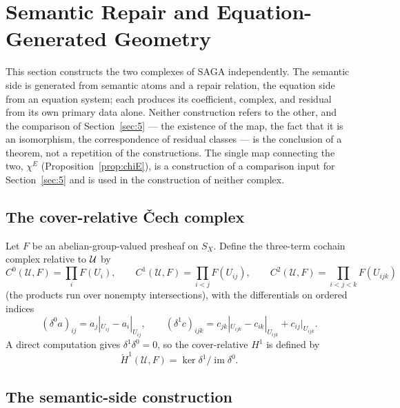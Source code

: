 \section{Semantic Repair and Equation-Generated Geometry}\label{sec:4}

This section constructs the two complexes of SAGA independently. The
semantic side is generated from semantic atoms and a repair relation, the
equation side from an equation system; each produces its coefficient,
complex, and residual from its own primary data alone. Neither
construction refers to the other, and the comparison of
Section~\ref{sec:5} --- the existence of the map, the fact that it is an
isomorphism, the correspondence of residual classes --- is the conclusion of a theorem,
not a repetition of the constructions. The single map connecting the two,
$\chi^E$ (Proposition~\ref{prop:chiE}), is a construction of a comparison
input for Section~\ref{sec:5} and is used in the construction of neither
complex.

\subsection{The cover-relative \v{C}ech complex}\label{sec:41}

Let $F$ be an abelian-group-valued presheaf on $S_X$. Define the
three-term cochain complex relative to $\mathcal{U}$ by
\[
C^0(\mathcal U,F)=\prod_iF(U_i),\qquad
C^1(\mathcal U,F)=\prod_{i<j}F(U_{ij}),\qquad
C^2(\mathcal U,F)=\prod_{i<j<k}F(U_{ijk})
\]
(the products run over nonempty intersections), with the differentials on
ordered indices
\[
(\delta^0a)_{ij}=a_j|_{U_{ij}}-a_i|_{U_{ij}},
\qquad
(\delta^1c)_{ijk}=c_{jk}|_{U_{ijk}}-c_{ik}|_{U_{ijk}}+c_{ij}|_{U_{ijk}}.
\]
A direct computation gives $\delta^1\delta^0=0$, so the cover-relative
$H^1$ is defined by
\[
\check H^1(\mathcal U,F)=\ker\delta^1/\operatorname{im}\delta^0.
\]

\subsection{The semantic-side construction}\label{sec:42}

